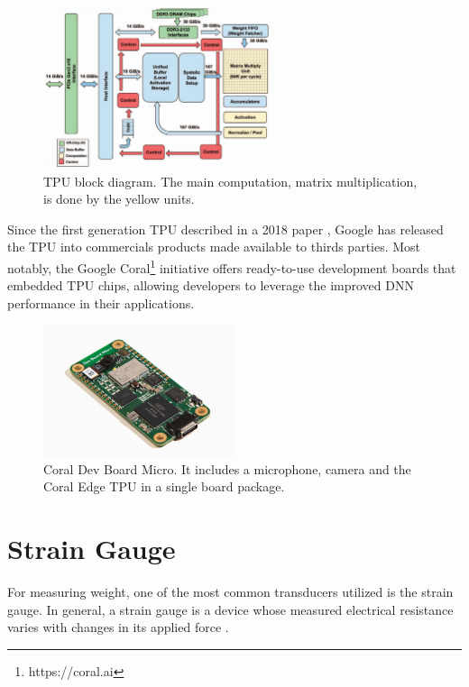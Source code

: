 \documentclass[openright]{normas-utf-tex} %
\begin{document}
\begin{figure}[H]
	\centering
	\includegraphics[width=0.6\textwidth]{./images/tpublock.png}
	\caption[TPU block diagram]{TPU block diagram. The main computation, matrix multiplication, is done by the yellow units.}
	\label{fig:gauge1}
\end{figure}

Since the first generation TPU described in a 2018 paper \cite{Google2015},
Google has released the TPU into commercials products made available to thirds
parties. Most notably, the Google Coral\footnote{https://coral.ai} initiative
offers ready-to-use development boards that embedded TPU chips, allowing
developers to leverage the improved DNN performance in their applications.

\begin{figure}[H]
	\centering
	\includegraphics[width=0.5\textwidth]{./images/coralboard.png}
	\caption[Coral Dev Board Micro]{Coral Dev Board Micro. It includes a microphone, camera and the Coral Edge TPU in a single board package.}
\end{figure}

\section{Strain Gauge}

For measuring weight, one of the most common transducers utilized is the strain
gauge. In general, a strain gauge is a device whose measured electrical
resistance varies with changes in its applied force \cite{Stefanescu}.
\end{document}
